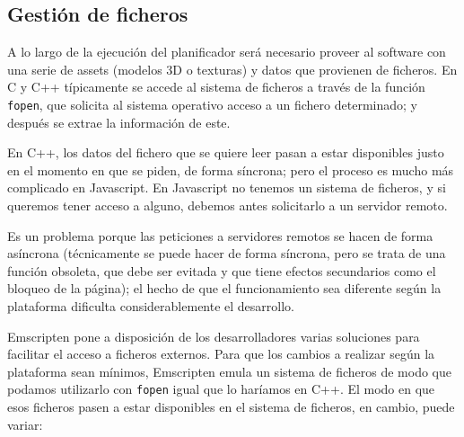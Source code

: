 
\subsection{Gestión de ficheros}
\label{emscripten_filesistem}
A lo largo de la ejecución del planificador será necesario proveer al software con una serie de assets (modelos 3D o texturas) y datos que provienen de ficheros. En C y C++ típicamente se accede al sistema de ficheros a través de la función \texttt{fopen}, que solicita al sistema operativo acceso a un fichero determinado; y después se extrae la información de este.

En C++, los datos del fichero que se quiere leer pasan a estar disponibles justo en el momento en que se piden, de forma síncrona; pero el proceso es mucho más complicado en Javascript. En Javascript no tenemos un sistema de ficheros, y si queremos tener acceso a alguno, debemos antes solicitarlo a un servidor remoto.

Es un problema porque las peticiones a servidores remotos se hacen de forma asíncrona (técnicamente se puede hacer de forma síncrona, pero se trata de una función obsoleta, que debe ser evitada y que tiene efectos secundarios como el bloqueo de la página); el hecho de que el funcionamiento sea diferente según la plataforma dificulta considerablemente el desarrollo.

Emscripten pone a disposición de los desarrolladores varias soluciones para facilitar el acceso a ficheros externos. Para que los cambios a realizar según la plataforma sean mínimos, Emscripten emula un sistema de ficheros de modo que podamos utilizarlo con \texttt{fopen} igual que lo haríamos en C++. El modo en que esos ficheros pasen a estar disponibles en el sistema de ficheros, en cambio, puede variar:

